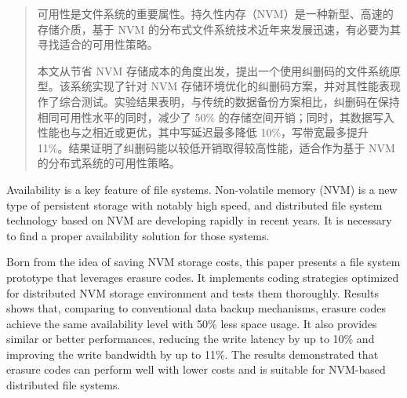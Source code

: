 

\begin{abstract}
  可用性是文件系统的重要属性。持久性内存（NVM）是一种新型、高速的存储介质，基于 NVM 的分布式文件系统技术近年来发展迅速，有必要为其寻找适合的可用性策略。
  
  本文从节省 NVM 存储成本的角度出发，提出一个使用纠删码的文件系统原型。该系统实现了针对 NVM 存储环境优化的纠删码方案，并对其性能表现作了综合测试。实验结果表明，与传统的数据备份方案相比，纠删码在保持相同可用性水平的同时，减少了 50\% 的存储空间开销；同时，其数据写入性能也与之相近或更优，其中写延迟最多降低 10\%，写带宽最多提升 11\%。结果证明了纠删码能以较低开销取得较高性能，适合作为基于 NVM 的分布式系统的可用性策略。

\end{abstract}

\begin{abstract*}
  Availability is a key feature of file systems. Non-volatile memory (NVM) is a new type of persistent storage with notably high speed, and distributed file system technology based on NVM are developing rapidly in recent years. It is necessary to find a proper availability solution for those systems.
  
  Born from the idea of saving NVM storage costs, this paper presents a file system prototype that leverages erasure codes. It implements coding strategies optimized for distributed NVM storage environment and tests them thoroughly. Results shows that, comparing to conventional data backup mechanisms, erasure codes achieve the same availability level with 50\% less space usage. It also provides similar or better performances, reducing the write latency by up to 10\% and improving the write bandwidth by up to 11\%. The results demonstrated that erasure codes can perform well with lower costs and is suitable for NVM-based distributed file systems.

\end{abstract*}
